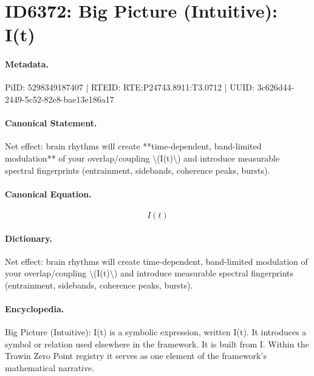 \section*{ID6372: Big Picture (Intuitive): I(t)}
\paragraph{Metadata.}
PiID: 5298349187407 | RTEID: RTE:P24743.8911:T3.0712 | UUID: 3c626d44-2449-5c52-82e8-bae13e186a17

\paragraph{Canonical Statement.}
Net effect: brain rhythms will create **time-dependent, band-limited modulation** of your overlap/coupling \textbackslash{}(I(t)\textbackslash{}) and introduce measurable spectral fingerprints (entrainment, sidebands, coherence peaks, bursts).

\paragraph{Canonical Equation.}
\[
I(t)
\]

\paragraph{Dictionary.}
Net effect: brain rhythms will create time-dependent, band-limited modulation of your overlap/coupling \textbackslash{}(I(t)\textbackslash{}) and introduce measurable spectral fingerprints (entrainment, sidebands, coherence peaks, bursts).

\paragraph{Encyclopedia.}
Big Picture (Intuitive): I(t) is a symbolic expression, written I(t). It introduces a symbol or relation used elsewhere in the framework. It is built from I. Within the Trawin Zero Point registry it serves as one element of the framework's mathematical narrative.
